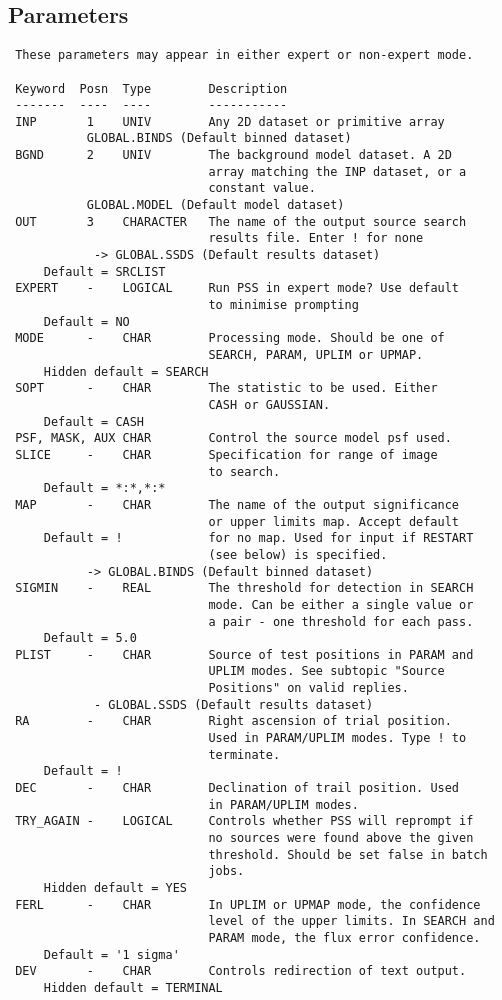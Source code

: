 \documentclass{book}
\renewcommand{\_}{{\tt\char'137}}     %
\begin{document}
\subsection{Parameters}
\begin{verbatim}
 These parameters may appear in either expert or non-expert mode.
 
 Keyword  Posn  Type        Description
 -------  ----  ----        -----------
 INP       1    UNIV        Any 2D dataset or primitive array
           GLOBAL.BINDS (Default binned dataset)
 BGND      2    UNIV        The background model dataset. A 2D
                            array matching the INP dataset, or a
                            constant value.
           GLOBAL.MODEL (Default model dataset)
 OUT       3    CHARACTER   The name of the output source search
                            results file. Enter ! for none
            -> GLOBAL.SSDS (Default results dataset)
     Default = SRCLIST
 EXPERT    -    LOGICAL     Run PSS in expert mode? Use default
                            to minimise prompting
     Default = NO
 MODE      -    CHAR        Processing mode. Should be one of
                            SEARCH, PARAM, UPLIM or UPMAP.
     Hidden default = SEARCH
 SOPT      -    CHAR        The statistic to be used. Either
                            CASH or GAUSSIAN.
     Default = CASH
 PSF, MASK, AUX CHAR        Control the source model psf used.
 SLICE     -    CHAR        Specification for range of image
                            to search.
     Default = *:*,*:*
 MAP       -    CHAR        The name of the output significance
                            or upper limits map. Accept default
     Default = !            for no map. Used for input if RESTART
                            (see below) is specified.
           -> GLOBAL.BINDS (Default binned dataset)
 SIGMIN    -    REAL        The threshold for detection in SEARCH
                            mode. Can be either a single value or
                            a pair - one threshold for each pass.
     Default = 5.0
 PLIST     -    CHAR        Source of test positions in PARAM and
                            UPLIM modes. See subtopic "Source
                            Positions" on valid replies.
            - GLOBAL.SSDS (Default results dataset)
 RA        -    CHAR        Right ascension of trial position.
                            Used in PARAM/UPLIM modes. Type ! to
                            terminate.
     Default = !
 DEC       -    CHAR        Declination of trail position. Used
                            in PARAM/UPLIM modes.
 TRY_AGAIN -    LOGICAL     Controls whether PSS will reprompt if
                            no sources were found above the given
                            threshold. Should be set false in batch
                            jobs.
     Hidden default = YES
 FERL      -    CHAR        In UPLIM or UPMAP mode, the confidence
                            level of the upper limits. In SEARCH and
                            PARAM mode, the flux error confidence.
     Default = '1 sigma'
 DEV       -    CHAR        Controls redirection of text output.
     Hidden default = TERMINAL
 

\end{verbatim}
\end{document}
